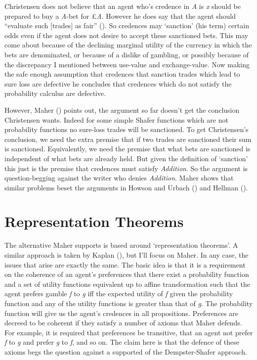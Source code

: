 \documentclass[
  11pt,
  letterpaper,
  DIV=11,
  numbers=noendperiod,
  twoside]{scrartcl}
\begin{document}
Christensen does not believe that an agent who's credence in \emph{A} is
\emph{x} should be prepared to buy a \emph{A}-bet for £\emph{A}. However
he does say that the agent should ``evaluate such {[}trades{]} as fair''
(). So credences
may `sanction' (his term) certain odds even if the agent does not desire
to accept these sanctioned bets. This may come about because of the
declining marginal utility of the currency in which the bets are
denominated, or because of a dislike of gambling, or possibly because of
the discrepancy I mentioned between use-value and exchange-value. Now
making the safe enough assumption that credences that sanction trades
which lead to sure loss are defective he concludes that credences which
do not satisfy the probability calculus are defective.

However, Maher () points out, the
argument so far doesn't get the conclusion Christensen wants. Indeed for
some simple Shafer functions which are not probability functions no
sure-loss trades will be sanctioned. To get Christensen's conclusion, we
need the extra premise that if two trades are sanctioned their sum is
sanctioned. Equivalently, we need the premise that what bets are
sanctioned is independent of what bets are already held. But given the
definition of `sanction' this just is the premise that credences must
satisfy \emph{Addition}. So the argument is question-begging against the
writer who denies \emph{Addition}. Maher shows that similar problems
beset the arguments in Howson and Urbach
() and Hellman
().

\section{Representation Theorems}\label{representation-theorems}

The alternative Maher supports is based around `representation
theorems'. A similar approach is taken by Kaplan
(), but I'll focus on Maher. In any case,
the issues that arise are exactly the same. The basic idea is that it is
a requirement on the coherence of an agent's preferences that there
exist a probability function and a set of utility functions equivalent
up to affine transformation such that the agent prefers gamble \emph{f}
to \emph{g} iff the expected utility of \emph{f} given the probability
function and any of the utility functions is greater than that of
\emph{g}. The probability function will give us the agent's credences in
all propositions. Preferences are decreed to be coherent if they satisfy
a number of axioms that Maher defends. For example, it is required that
preferences be transitive, that an agent not prefer \emph{f} to \emph{g}
and prefer \emph{g} to \emph{f}, and so on. The claim here is that the
defence of these axioms begs the question against a supported of the
Dempster-Shafer approach.
\end{document}
